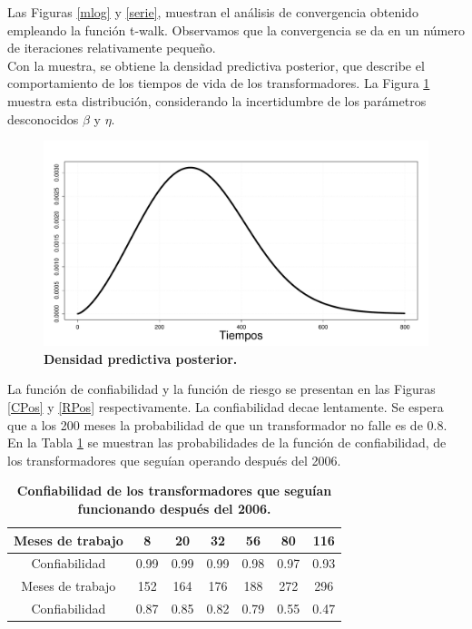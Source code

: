 \noindent Las Figuras \ref{mlog} y \ref{serie}, muestran el an\'alisis de convergencia obtenido empleando la funci\'on t-walk. Observamos que la convergencia se da en un n\'umero de iteraciones relativamente peque\~no.\\[0.2cm]
\noindent Con la muestra, se obtiene  la densidad predictiva posterior, que describe el comportamiento de los tiempos de vida de los transformadores. La Figura \ref{apripos} muestra esta distribuci\'on, considerando la incertidumbre de los par\'ametros desconocidos $\beta$ y $\eta$.
\begin{figure}
\begin{center}
\includegraphics[scale=0.25]{DenPos.pdf}
\end{center}
\vspace{-1 cm} \caption{{\bf Densidad predictiva  posterior.}\label{apripos}}
\end{figure}


\noindent La funci\'on de confiabilidad y la funci\'on de riesgo se presentan en las Figuras \ref{CPos} y \ref{RPos} respectivamente. La confiabilidad decae lentamente. Se espera que a los 200 meses la probabilidad de que un transformador no falle es de 0.8. En la Tabla  \ref{conf} se muestran las probabilidades  de la funci\'on de confiabilidad, de los transformadores que segu\'ian operando despu\'es del 2006.

\begin{table}[h!]\small
\centering
\caption{\bf Confiabilidad de los transformadores que segu\'ian funcionando despu\'es del 2006.}\label{conf}
\vspace{.2cm}
\begin{tabular}{c|cccccc}
\toprule[0.6mm]
Meses de trabajo &8 &  20 & 32  & 56 & 80 &116  \\
\hline
Confiabilidad & 0.99 &0.99     &  0.99   &0.98 &0.97  &0.93 \\
\hline
Meses de trabajo &152 &164 &176& 188& 272& 296  \\
\hline
Confiabilidad & 0.87  &0.85   &  0.82     & 0.79 &0.55  &0.47 \\
\toprule[0.6mm]
\end{tabular}
\end{table}

